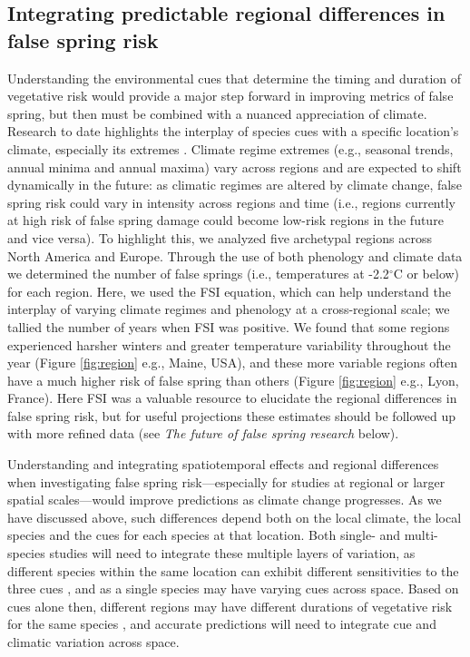 \documentclass{article}\usepackage[]{graphicx}\usepackage[]{color}
\begin{document}
\subsection* {Integrating predictable regional differences in false spring risk} %
Understanding the environmental cues that determine the timing and duration of vegetative risk would provide a major step forward in improving metrics of false spring, but then must be combined with a nuanced appreciation of climate. Research to date \citep{Hanninen2011, Savolainen2007, Vitasse2009} highlights the interplay of species cues with a specific location's climate, especially its extremes \citep{Jochner2011, Reyer2013}. Climate regime extremes (e.g., seasonal trends, annual minima and annual maxima) vary across regions and are expected to shift dynamically in the future: as climatic regimes are altered by climate change, false spring risk could vary in intensity across regions and time (i.e., regions currently at high risk of false spring damage could become low-risk regions in the future and vice versa). To highlight this, we analyzed five archetypal regions across North America and Europe. Through the use of both phenology \citep{Soudani2012, Schaber2005, USA-NPN2016, White2009} and climate data \citep[from the NOAA Climate Data Online tool][]{NOAA} we determined the number of false springs (i.e., temperatures at -2.2$^{\circ}$C or below) for each region. Here, we used the FSI equation, which can help understand the interplay of varying climate regimes and phenology at a cross-regional scale; we tallied the number of years when FSI was positive. We found that some regions experienced harsher winters and greater temperature variability throughout the year (Figure \ref{fig:region} e.g., Maine, USA), and these more variable regions often have a much higher risk of false spring than others (Figure \ref{fig:region} e.g., Lyon, France). Here FSI was a valuable resource to elucidate the regional differences in false spring risk, but for useful projections these estimates should be followed up with more refined data (see \emph{The future of false spring research} below). 

Understanding and integrating spatiotemporal effects and regional differences when investigating false spring risk---especially for studies at regional or larger spatial scales---would improve predictions as climate change progresses. As we have discussed above, such differences depend both on the local climate, the local species and the cues for each species at that location. Both single- and multi-species studies will need to integrate these multiple layers of variation, as different species within the same location can exhibit different sensitivities to the three cues \citep{Basler2012, Laube2013}, and as a single species may have varying cues across space. Based on cues alone then, different regions may have different durations of vegetative risk for the same species \citep {Caffarra2011, Partanen2004, Viheraaarnio2006}, and accurate predictions will need to integrate cue and climatic variation across space.
\end{document}
